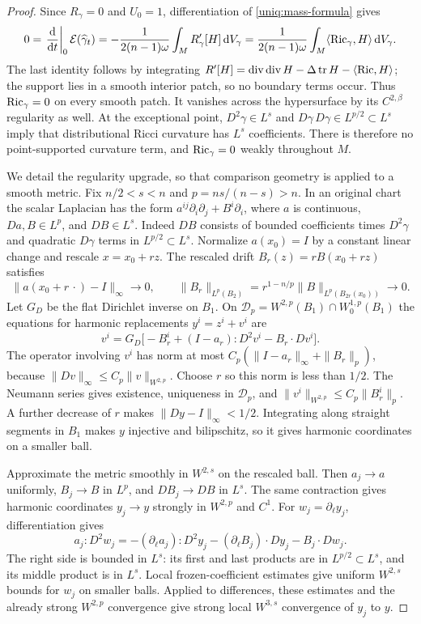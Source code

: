 \begin{proof}
Since $R_\gamma=0$ and $U_0=1$, differentiation of
\eqref{uniq:mass-formula} gives
\begin{equation}\label{uniq:mass-derivative}
 0=\left.\frac{\mathrm d}{\mathrm d t}\right|_0
          \mathcal E(\widehat\gamma_t)
  =-\frac{1}{2(n-1)\omega}\int_M R'_\gamma[H]\,\mathrm d V_\gamma
  =\frac{1}{2(n-1)\omega}
          \int_M\langle\operatorname{Ric}_\gamma,H\rangle\,\mathrm d V_\gamma.
\end{equation}
The last identity follows by integrating
$R'[H]=\operatorname{div}\operatorname{div} H-\Delta\operatorname{tr} H-\langle\operatorname{Ric},H\rangle$;
the support lies in a smooth interior patch, so no boundary terms
occur. Thus $\operatorname{Ric}_\gamma=0$ on every smooth patch. It vanishes
across the hypersurface by its $C^{2,\beta}$ regularity as well.
At the exceptional point, $D^2\gamma\in L^s$ and
$D\gamma\,D\gamma\in L^{p/2}\subset L^s$ imply that
distributional Ricci curvature has $L^s$ coefficients. There is
therefore no point-supported curvature term, and $\operatorname{Ric}_\gamma=0$
weakly throughout $M$.

We detail the regularity upgrade, so that comparison geometry is
applied to a smooth metric. Fix $n/2<s<n$ and
$p=ns/(n-s)>n$. In an original chart the scalar Laplacian has
the form $a^{ij}\partial_i\partial_j+B^i\partial_i$,
where $a$ is continuous, $Da,B\in L^p$, and $DB\in L^s$.
Indeed $DB$ consists of bounded coefficients times $D^2\gamma$
and quadratic $D\gamma$ terms in $L^{p/2}\subset L^s$.
Normalize $a(x_0)=I$ by a constant linear change and rescale
$x=x_0+r z$. The rescaled drift $B_r(z)=rB(x_0+r z)$ satisfies
\[
 \|a(x_0+r\,\cdot)-I\|_{\infty}\longrightarrow0,
 \qquad
 \|B_r\|_{L^p(B_2)}
   =r^{1-n/p}\|B\|_{L^p(B_{2r}(x_0))}\longrightarrow0.
\]
Let $G_D$ be the flat Dirichlet inverse on $B_1$. On
$\mathcal D_p=W^{2,p}(B_1)\cap W^{1,p}_0(B_1)$ the equations
for harmonic replacements $y^i=z^i+v^i$ are
\[
 v^i=G_D\bigl[-B_r^i+(I-a_r):D^2v^i-B_r\cdot Dv^i\bigr].
\]
The operator involving $v^i$ has norm at most
$C_p(\|I-a_r\|_\infty+\|B_r\|_p)$, because
$\|Dv\|_\infty\leq C_p\|v\|_{W^{2,p}}$. Choose $r$ so this
norm is less than $1/2$. The Neumann series gives existence,
uniqueness in $\mathcal D_p$, and
$\|v^i\|_{W^{2,p}}\leq C_p\|B_r^i\|_p$. A further decrease
of $r$ makes $\|Dy-I\|_\infty<1/2$. Integrating along straight
segments in $B_1$ makes $y$ injective and bilipschitz, so it gives
harmonic coordinates on a smaller ball.

Approximate the metric smoothly in $W^{2,s}$ on the rescaled
ball. Then $a_j\to a$ uniformly, $B_j\to B$ in $L^p$, and
$DB_j\to DB$ in $L^s$. The same contraction gives harmonic
coordinates $y_j\to y$ strongly in $W^{2,p}$ and $C^1$.
For $w_j=\partial_\ell y_j$, differentiation gives
\[
 a_j:D^2w_j
 =-(\partial_\ell a_j):D^2y_j
   -(\partial_\ell B_j)\cdot Dy_j-B_j\cdot Dw_j.
\]
The right side is bounded in $L^s$: its first and last products
are in $L^{p/2}\subset L^s$, and its middle product is in
$L^s$. Local frozen-coefficient estimates give uniform
$W^{2,s}$ bounds for $w_j$ on smaller balls. Applied to differences,
these estimates and the already strong $W^{2,p}$ convergence give
strong local $W^{3,s}$ convergence of $y_j$ to $y$.


\end{proof}

